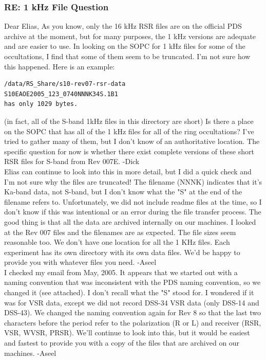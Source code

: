 \documentclass[crop=false,class=article,oneside]{standalone}
\begin{document}
\subsubsection{\footnotesize RE: 1 kHz File Question}
Dear Elias, As you know, only the 16 kHz RSR files are on the official PDS archive at the moment, but for many purposes, the 1 kHz versions are adequate and are easier to use. In looking on the SOPC for 1 kHz files for some of the occultations, I find that some of them seem to be truncated. I'm not sure how this happened. Here is an example:
\begin{lstlisting}[language=bash]
/data/RS_Share/s10-rev07-rsr-data
S10EAOE2005_123_0740NNNK34S.1B1
has only 1029 bytes.
\end{lstlisting}
(in fact, all of the S-band 1kHz files in this directory are short)
Is there a place on the SOPC that has all of the 1 kHz files for all of the ring occultations? I've tried to gather many of them, but I don't know of an authoritative location. The specific question for now is whether there exist complete versions of these short RSR files for S-band from Rev 007E. -Dick\\
Elias can continue to look into this in more detail, but I did a quick check and I'm not sure why the files are truncated! The filename (NNNK) indicates that it's Ka-band data, not S-band, but I don't know what the "S" at the end of the filename refers to.  Unfortunately, we did not include readme files at the time, so I don't know if this was intentional or an error during the file transfer process. The good thing is that all the data are archived internally on our machines.  I looked at the Rev 007 files and the filenames are as expected.  The file sizes seem reasonable too. We don't have one location for all the 1 KHz files.  Each experiment has its own directory with its own data files.  We'd be happy to provide you with whatever files you need. -Aseel\\
I checked my email from May, 2005.  It appears that we started out with a naming convention that was inconsistent with the PDS naming convention, so we changed it (see attached).  I don't recall what the "S" stood for.  I wondered if it was for VSR data, except we did not record DSS-34 VSR data (only DSS-14 and DSS-43). We changed the naming convention again for Rev 8 so that the last two characters before the period refer to the polarization (R or L) and receiver (RSR, VSR, WVSR, PRSR). We'll continue to look into this, but it would be easiest and fastest to provide you with a copy of the files that are archived on our machines. -Aseel
\end{document}
